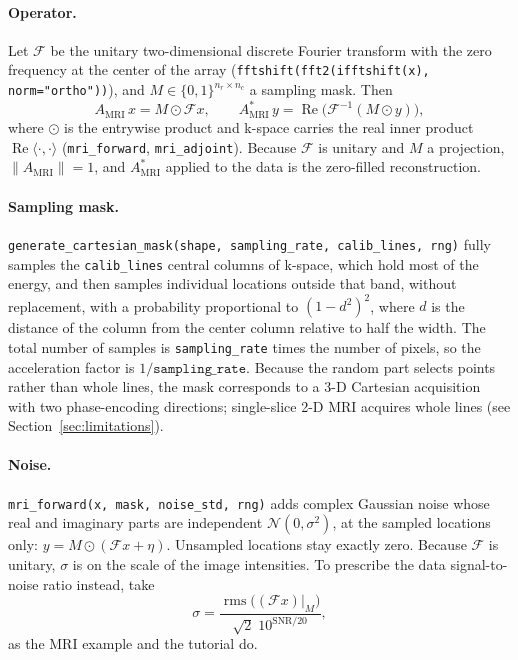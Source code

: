\documentclass[11pt,a4paper]{article}
\newcommand{\code}[1]{\texttt{#1}}
\newcommand{\F}{\mathcal F}
\begin{document}
\paragraph{Operator.} Let $\F$ be the unitary two-dimensional discrete
Fourier transform with the zero frequency at the center of the array
(\code{fftshift(fft2(ifftshift(x), norm="ortho"))}), and
$M\in\{0,1\}^{n_r\times n_c}$ a sampling mask. Then
\begin{equation}\label{eq:mri}
  A_{\mathrm{MRI}}\,x = M\odot\F x, \qquad
  A_{\mathrm{MRI}}^*\,y = \operatorname{Re}\bigl(\F^{-1}(M\odot y)\bigr),
\end{equation}
where $\odot$ is the entrywise product and k-space carries the real inner
product $\operatorname{Re}\langle\cdot,\cdot\rangle$
(\code{mri\_forward}, \code{mri\_adjoint}). Because $\F$ is unitary and $M$
a projection, $\|A_{\mathrm{MRI}}\|=1$, and $A_{\mathrm{MRI}}^*$ applied to
the data is the zero-filled reconstruction.

\paragraph{Sampling mask.} \code{generate\_cartesian\_mask(shape,
sampling\_rate, calib\_lines, rng)} fully samples the \code{calib\_lines}
central columns of k-space, which hold most of the energy, and then samples
individual locations outside that band, without replacement, with a
probability proportional to $(1-d^2)^2$, where $d$ is the distance of the
column from the center column relative to half the width. The total number of
samples is \code{sampling\_rate} times the number of pixels, so the
acceleration factor is $1/\code{sampling\_rate}$. Because the random part
selects points rather than whole lines, the mask corresponds to a 3-D
Cartesian acquisition with two phase-encoding directions; single-slice 2-D
MRI acquires whole lines (see Section~\ref{sec:limitations}).

\paragraph{Noise.} \code{mri\_forward(x, mask, noise\_std, rng)} adds
complex Gaussian noise whose real and imaginary parts are independent
$\mathcal N(0,\sigma^2)$, at the sampled locations only:
$y = M\odot(\F x + \eta)$. Unsampled locations stay exactly zero. Because
$\F$ is unitary, $\sigma$ is on the scale of the image intensities. To
prescribe the data signal-to-noise ratio instead, take
\begin{equation}\label{eq:snr}
  \sigma = \frac{\operatorname{rms}\bigl((\F x)|_M\bigr)}
                {\sqrt2\;10^{\mathrm{SNR}/20}} ,
\end{equation}
as the MRI example and the tutorial do.
\end{document}

